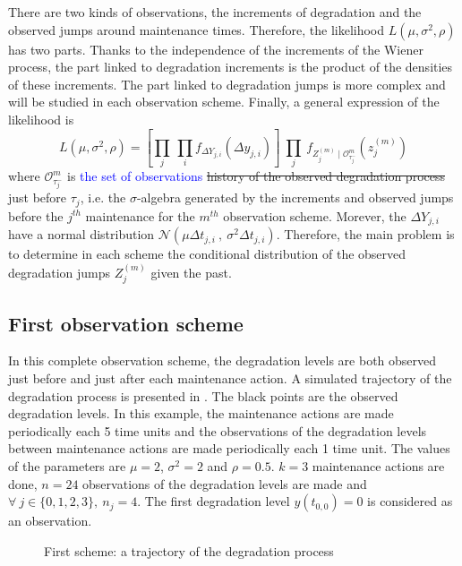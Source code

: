 There are two kinds of observations, the increments of degradation and the observed jumps around maintenance times. Therefore, the likelihood $L(\mu,\sigma^2,\rho)$ has two parts. Thanks to the independence of the increments of the Wiener process, the part linked to degradation increments is the product of the densities of these increments. The part linked to degradation jumps is more complex and will be studied in each observation scheme. Finally, a general expression of the likelihood is
\begin{equation}
L(\mu,\sigma^2,\rho)= \left[\prod\limits_{j} \ \prod\limits_i f_{\Delta Y_{j,i}} (\Delta y_{j,i}) \right] \ \prod\limits_j\ f_{Z_j^{(m)} \mid \mathcal{O}_{\tau_j^-}^m}(z_j^{(m)})
\label{eq:likelihood}
\end{equation}
\noindent where $\mathcal{O}_{\tau_{j}^-}^m$ is \textcolor{blue}{the set of observations} \st{history of the observed degradation process} just before $\tau_{j}$, i.e. the $\sigma$-algebra generated by the increments and observed jumps before the $j^{th}$ maintenance for the $m^{th}$ observation scheme. Morever, the $\Delta Y_{j,i}$ have a normal distribution $\mathcal{N}(\mu \Delta t_{j,i}\ ,\ \sigma^2 \Delta t_{j,i})$. Therefore, the main problem is to determine in each scheme the conditional distribution of the observed degradation jumps $Z_j^{(m)}$ given the past.


\subsection{First observation scheme}
\label{1case}

In this complete observation scheme, the degradation levels are both observed just before and just after each maintenance action. A simulated trajectory of the degradation process is presented in . The black points are the observed degradation levels. 
In this example, the maintenance actions are made periodically each 5 time units and the observations of the degradation levels between maintenance actions are made periodically each  1 time unit.  The values of the parameters are $\mu=2$, $\sigma^2=2$ and $\rho=0.5$. $k=3$ maintenance actions are done, $n=24$ observations of the degradation levels are made and $\forall\ j \in \{0,1,2,3\},\ n_j=4$. The first degradation level $y(t_{0,0})=0$ is considered as an observation.

\begin{figure}[htbp]
\caption{First scheme: a trajectory of the degradation process}
\label{fig:cas1}
\end{figure}

